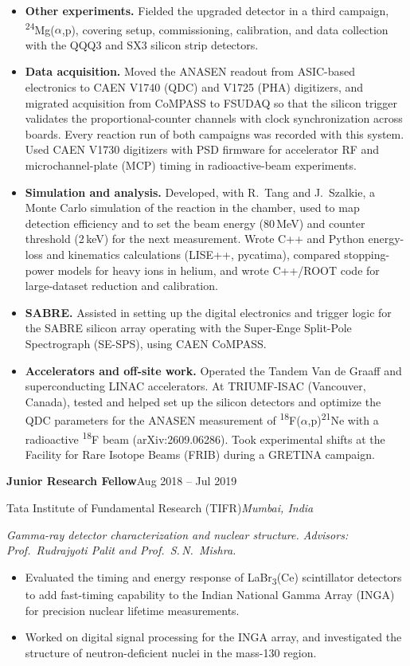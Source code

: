\documentclass[10pt,letterpaper]{article}
\newcommand{\entry}[4]{%
  \par\addvspace{4pt}\noindent\textbf{#1}\hfill #2\par\nopagebreak
  \noindent #3\hfill\textit{#4}\par\nopagebreak}
\newcommand{\entrynote}[1]{\noindent\textit{#1}\par\nopagebreak}
\newcommand{\iso}[2]{\textsuperscript{#1}#2}
\newcommand{\ap}{(\ensuremath{\alpha},p)}
\begin{document}
\begin{itemize}
  \item \textbf{Other experiments.} Fielded the upgraded detector in a third campaign, \iso{24}{Mg}\ap, covering setup, commissioning, calibration, and data collection with the QQQ3 and SX3 silicon strip detectors.
  \item \textbf{Data acquisition.} Moved the ANASEN readout from ASIC-based electronics to CAEN V1740 (QDC) and V1725 (PHA) digitizers, and migrated acquisition from CoMPASS to FSUDAQ so that the silicon trigger validates the proportional-counter channels with clock synchronization across boards. Every reaction run of both campaigns was recorded with this system. Used CAEN V1730 digitizers with PSD firmware for accelerator RF and microchannel-plate (MCP) timing in radioactive-beam experiments.
  \item \textbf{Simulation and analysis.} Developed, with R.~Tang and J.~Szalkie, a Monte Carlo simulation of the reaction in the chamber, used to map detection efficiency and to set the beam energy (80\,MeV) and counter threshold (2\,keV) for the next measurement. Wrote C++ and Python energy-loss and kinematics calculations (LISE++, pycatima), compared stopping-power models for heavy ions in helium, and wrote C++/ROOT code for large-dataset reduction and calibration.
  \item \textbf{SABRE.} Assisted in setting up the digital electronics and trigger logic for the SABRE silicon array operating with the Super-Enge Split-Pole Spectrograph (SE-SPS), using CAEN CoMPASS.
  \item \textbf{Accelerators and off-site work.} Operated the Tandem Van de Graaff and superconducting LINAC accelerators. At TRIUMF-ISAC (Vancouver, Canada), tested and helped set up the silicon detectors and optimize the QDC parameters for the ANASEN measurement of \iso{18}{F}\ap\iso{21}{Ne} with a radioactive \iso{18}{F} beam (arXiv:2609.06286). Took experimental shifts at the Facility for Rare Isotope Beams (FRIB) during a GRETINA campaign.
\end{itemize}

\entry{Junior Research Fellow}{Aug 2018 -- Jul 2019}{Tata Institute of Fundamental Research (TIFR)}{Mumbai, India}
\entrynote{Gamma-ray detector characterization and nuclear structure. Advisors: Prof.\ Rudrajyoti Palit and Prof.\ S.\,N.\ Mishra.}
\begin{itemize}
  \item Evaluated the timing and energy response of LaBr\textsubscript{3}(Ce) scintillator detectors to add fast-timing capability to the Indian National Gamma Array (INGA) for precision nuclear lifetime measurements.
  \item Worked on digital signal processing for the INGA array, and investigated the structure of neutron-deficient nuclei in the mass-130 region.
\end{itemize}
\end{document}
